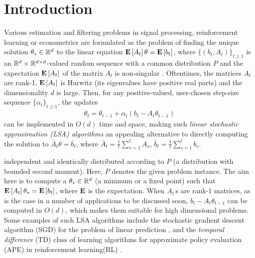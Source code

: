 
\section{Introduction}\label{sec:intro}
Various estimation and filtering problems in signal processing, reinforcement learning or econometrics
are formulated as the problem of finding the unique solution $\theta_*\in \mathbb{R}^d$ 
to the linear equation $\mathbf{E}\left[A_t\right] \theta = \mathbf{E}\left[b_t\right]$,
where $\{(b_t,A_t)\}_{t\ge 1}$ is an $\mathbb{R}^d \times \mathbb{R}^{d \times d}$-valued random sequence with a common distribution $P$
and the expectation $\mathbf{E}\left[A_t\right]$ of the matrix $A_t$ is non-singular \citep[e.g.,][]{bemepri90,LjPfWa92,SoKo94,degylu96,
sutton,konda-tsitsiklis,KoTsi03LSA,gtd,gtd2,gtdmp}.
Oftentimes, the matrices $A_t$ are rank-1, $\mathbf{E}\left[A_t\right]$ is Hurwitz (its eigenvalues have positive real parts)
and the dimensionality $d$ is large.
Then, for any positive-valued, user-chosen step-size sequence $\{\alpha_t\}_{t\ge 1}$, the updates
\begin{align}\label{eq:lsaintro}
\theta_t=\theta_{t-1}+\alpha_t (b_t-A_t \theta_{t-1})
\end{align}
can be implemented in $O(d)$ time and space, making such 
\emph{linear stochastic approximation (LSA) algorithms} 
an appealing alternative to directly 
computing the solution to $\bar A_t \theta = \bar b_t$, where $\bar A_t = \frac1t\sum_{s=1}^t A_s$, $\bar b_t = \frac1t \sum_{s=1}^t b_s$.

independent and identically distributed according to $P$ (a distribution with bounded second moment). Here, $P$ denotes the given problem instance. The aim here is to compute a $\theta_*\in\mathbb{R}^d$ (a minimum or a fixed point) such that $\mathbf{E}\left[A_t\right]\theta_*=\mathbf{E}\left[b_t\right]$, where $\mathbf{E}$ is the expectation. When $A_t\,$s are rank-$1$ matrices, as is the case in a number of applications to be discussed soon, $b_t -A_t\theta_{t-1}$ can be computed in $O(d)$, which makes them suitable for high dimensional problems. Some examples of such LSA algorithms include the stochastic gradient descent algorithm (SGD) for the problem of linear prediction \cite{bach,bachaistats}, and the \emph{temporal difference} (TD) class of learning algorithms for approximate policy evaluation (APE) in reinforcement learning(RL) \cite{sutton,konda-tsitsiklis,KoTsi03LSA,gtd,gtd2,gtdmp}.
\fi

